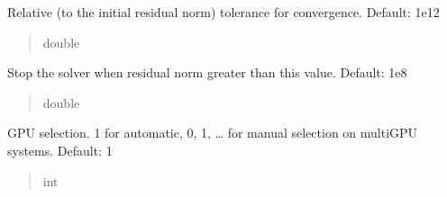 \documentclass[letterpaper,10pt,english]{sphinxmanual}
\begin{document}
\begin{fulllineitems}
\begin{fulllineitems}
\begin{quote}
\begin{description}
\end{description}\end{quote}

\end{fulllineitems}


\begin{fulllineitems}
\label{\detokenize{_autosummary/nirfasterff.utils.SolverOptions:nirfasterff.utils.SolverOptions.RelativeTolerance}}
\pysigstartsignatures
\pysigline
{}
\pysigstopsignatures
\sphinxAtStartPar
Relative (to the initial residual norm) tolerance for convergence. Default: 1e\sphinxhyphen{}12
\begin{quote}\begin{description}
\sphinxAtStartPar
double

\end{description}\end{quote}

\end{fulllineitems}


\begin{fulllineitems}
\label{\detokenize{_autosummary/nirfasterff.utils.SolverOptions:nirfasterff.utils.SolverOptions.divergence}}
\pysigstartsignatures
\pysigline
{}
\pysigstopsignatures
\sphinxAtStartPar
Stop the solver when residual norm greater than this value. Default: 1e8
\begin{quote}\begin{description}
\sphinxAtStartPar
double

\end{description}\end{quote}

\end{fulllineitems}


\begin{fulllineitems}
\label{\detokenize{_autosummary/nirfasterff.utils.SolverOptions:nirfasterff.utils.SolverOptions.GPU}}
\pysigstartsignatures
\pysigline
{}
\pysigstopsignatures
\sphinxAtStartPar
GPU selection. \sphinxhyphen{}1 for automatic, 0, 1, … for manual selection on multi\sphinxhyphen{}GPU systems. Default: \sphinxhyphen{}1
\begin{quote}\begin{description}
\sphinxAtStartPar
int


\end{description}
\end{quote}
\end{fulllineitems}
\end{fulllineitems}
\end{document}
